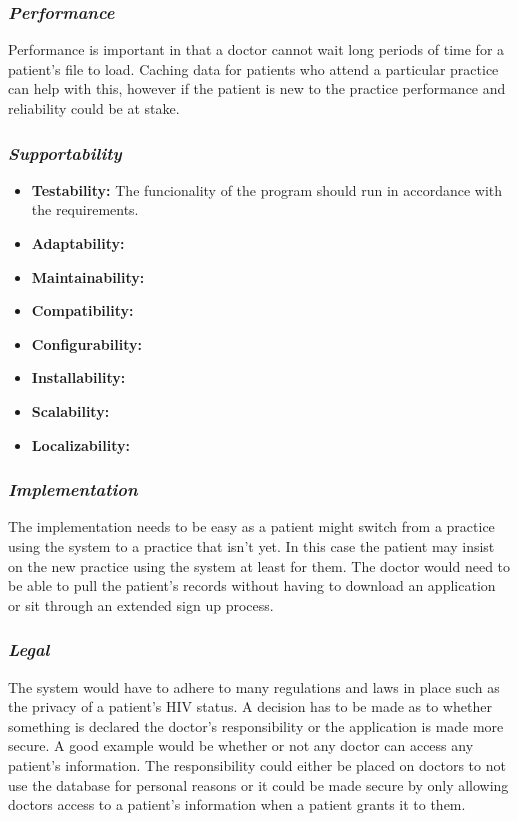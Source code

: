 \documentclass[a4paper]{article}
\begin{document}
	\subsubsection{\textit{Performance}}
	Performance is important in that a doctor cannot wait long periods of time for a patient's file to load. Caching data for patients who attend a particular practice can help with this, however if the patient is new to the practice performance and reliability could be at stake.
	
	\subsubsection{\textit{Supportability}}
	\begin{itemize}
		\item \textbf{Testability:} The funcionality of the program should run in accordance with the requirements.
		\item \textbf{Adaptability:}
		\item \textbf{Maintainability:}
		\item \textbf{Compatibility:}
		\item \textbf{Configurability:}
		\item \textbf{Installability:}
		\item \textbf{Scalability:}
		\item \textbf{Localizability:}
	\end{itemize}
	
	\subsubsection{\textit{Implementation}}
	The implementation needs to be easy as a patient might switch from a practice using the system to a practice that isn't yet. In this case the patient may insist on the new practice using the system at least for them. The doctor would need to be able to pull the patient's records without having to download an application or sit through an extended sign up process.
	
	\subsubsection{\textit{Legal}}
	The system would have to adhere to many regulations and laws in place such as the privacy of a patient's HIV status. A decision has to be made as to whether something is declared the doctor's responsibility or the application is made more secure. A good example would be whether or not any doctor can access any patient's information. The responsibility could either be placed on doctors to not use the database for personal reasons or it could be made secure by only allowing doctors access to a patient's information when a patient grants it to them.
		
\end{document}
